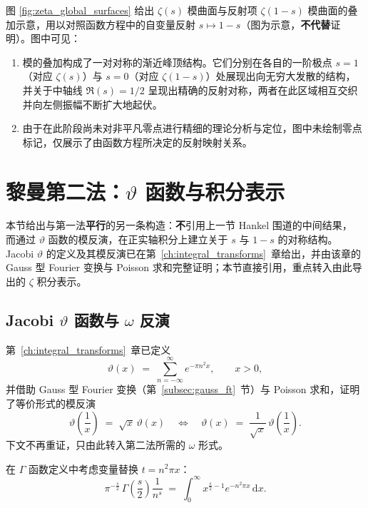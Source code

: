 图 \ref{fig:zeta_global_surfaces} 给出 $\zeta(s)$ 模曲面与反射项 $\zeta(1-s)$ 模曲面的叠加示意，用以对照函数方程中的自变量反射 $s\mapsto 1-s$（图为示意，\textbf{不代替}证明）。图中可见：
\begin{enumerate}
    \item 模的叠加构成了一对对称的渐近峰顶结构。它们分别在各自的一阶极点 $s=1$（对应 $\zeta(s)$）与 $s=0$（对应 $\zeta(1-s)$）处展现出向无穷大发散的结构，并关于中轴线 $\Re(s) = 1/2$ 呈现出精确的反射对称，两者在此区域相互交织并向左侧振幅不断扩大地起伏。
    \item 由于在此阶段尚未对非平凡零点进行精细的理论分析与定位，图中未绘制零点标记，仅展示了由函数方程所决定的反射映射关系。
\end{enumerate}

\section{黎曼第二法：\texorpdfstring{$\vartheta$}{theta} 函数与积分表示}\label{sec:theta_function_method}

本节给出与第一法\textbf{平行}的另一条构造：\textbf{不}引用上一节 Hankel 围道的中间结果，
而通过 $\vartheta$ 函数的模反演，在正实轴积分上建立关于 $s$ 与 $1-s$ 的对称结构。
Jacobi $\vartheta$ 的定义及其模反演已在第~\ref{ch:integral_transforms}~章给出，并由该章的 Gauss 型 Fourier 变换与 Poisson 求和完整证明；本节直接引用，重点转入由此导出的 $\zeta$ 积分表示。

\subsection{Jacobi \texorpdfstring{$\vartheta$}{theta} 函数与 \texorpdfstring{$\omega$}{omega} 反演}

第~\ref{ch:integral_transforms}~章已定义
\[
  \vartheta(x) \;=\; \sum_{n=-\infty}^{\infty} e^{-\pi n^2 x}, \qquad x>0,
\]
并借助 Gauss 型 Fourier 变换（第~\ref{subsec:gauss_ft}~节）与 Poisson 求和，证明了等价形式的模反演
\[
  \vartheta\!\left(\frac{1}{x}\right) \;=\; \sqrt{x}\, \vartheta(x)
  \quad\Longleftrightarrow\quad
  \vartheta(x) \;=\; \frac{1}{\sqrt{x}}\,\vartheta\!\left(\frac{1}{x}\right).
\]
下文不再重证，只由此转入第二法所需的 $\omega$ 形式。

在 $\Gamma$ 函数定义中考虑变量替换 $t = n^2 \pi x$：
\begin{equation}
\label{eq:gamma_sub_2}
  \pi^{-\frac{s}{2}} \, \Gamma\!\left(\frac{s}{2}\right) \frac{1}{n^s} \;=\;  \int_0^{\infty} x^{\frac{s}{2}-1} e^{-n^2 \pi x} \,\mathrm{d}x.
\end{equation}


